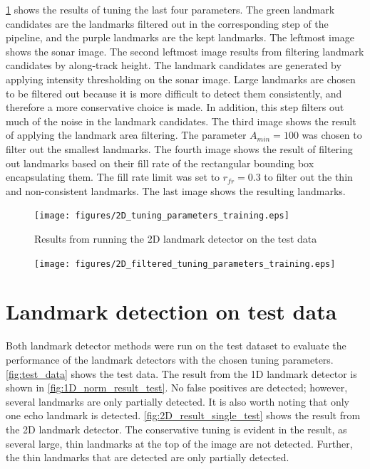\cref{fig:2d_tuning_paramaters_training} shows the results of tuning the last four parameters. The green landmark candidates are the landmarks filtered out in the corresponding step of the pipeline, and the purple landmarks are the kept landmarks. The leftmost image shows the sonar image. The second leftmost image results from filtering landmark candidates by along-track height. The landmark candidates are generated by applying intensity thresholding on the sonar image. Large landmarks are chosen to be filtered out because it is more difficult to detect them consistently, and therefore a more conservative choice is made. In addition, this step filters out much of the noise in the landmark candidates. The third image shows the result of applying the landmark area filtering. The parameter $A_{min} = 100$ was chosen to filter out the smallest landmarks. The fourth image shows the result of filtering out landmarks based on their fill rate of the rectangular bounding box encapsulating them. The fill rate limit was set to $r_{fr} = 0.3$ to filter out the thin and non-consistent landmarks. The last image shows the resulting landmarks.

\begin{figure}
    \centering
    \texttt{[image: figures/2D\_tuning\_parameters\_training.eps]}
    \caption[Results from testing the 2D landmark detector]{Results from running the 2D landmark detector on the test data}
     \label{fig:2d_tuning_paramaters_training}
\end{figure}

\begin{figure}
    \centering
    \texttt{[image: figures/2D\_filtered\_tuning\_parameters\_training.eps]}
    \caption[]{}
     \label{}
\end{figure}

\section{Landmark detection on test data}

Both landmark detector methods were run on the test dataset to evaluate the performance of the landmark detectors with the chosen tuning parameters. \cref{fig:test_data} shows the test data. The result from the 1D landmark detector is shown in \cref{fig:1D_norm_result_test}. No false positives are detected; however, several landmarks are only partially detected. It is also worth noting that only one echo landmark is detected. \cref{fig:2D_result_single_test} shows the result from the 2D landmark detector. The conservative tuning is evident in the result, as several large, thin landmarks at the top of the image are not detected. Further, the thin landmarks that are detected are only partially detected. 

